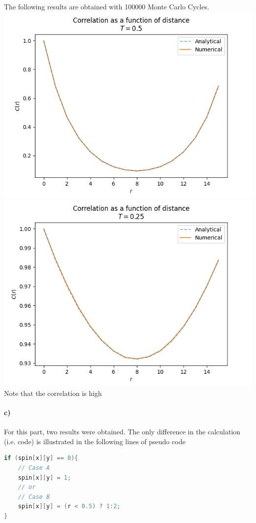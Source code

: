 \documentclass[12pt]{article}
\begin{document}
The following results are obtained with 100000 Monte Carlo Cycles.\\
\includegraphics[width = \textwidth]{hTcorr.png} \\
\includegraphics[width = \textwidth]{lTcorr.png}
\\
Note that the correlation is high 
\\ \\
\textbf{c)} \\
\\
\noindent For this part, two results were obtained. The only difference in the
calculation (i.e. code) is illustrated in the following lines of pseudo code

\begin{lstlisting}[language=C++]
if (spin[x][y] == 0){
    // Case A
    spin[x][y] = 1;
    // or
    // Case B
    spin[x][y] = (r < 0.5) ? 1:2;
}
\end{lstlisting}
\end{document}
